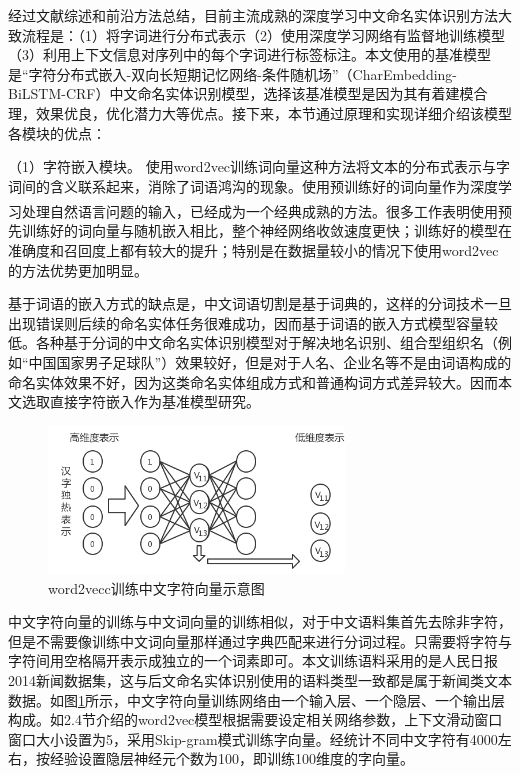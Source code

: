 \documentclass[winfonts,master,oneside,nobackinfo]{njuthesis}
\newcommand{\upcite}[1]{\textsuperscript{\textsuperscript{\cite{#1}}}}
\begin{document}
经过文献综述和前沿方法总结，目前主流成熟的深度学习中文命名实体识别方法大致流程是：（1）将字词进行分布式表示（2）使用深度学习网络有监督地训练模型（3）利用上下文信息对序列中的每个字词进行标签标注。本文使用的基准模型是“字符分布式嵌入-双向长短期记忆网络-条件随机场”（CharEmbedding-BiLSTM-CRF）中文命名实体识别模型，选择该基准模型是因为其有着建模合理，效果优良，优化潜力大等优点。接下来，本节通过原理和实现详细介绍该模型各模块的优点：

（1）字符嵌入模块。
使用word2vec训练词向量这种方法将文本的分布式表示与字词间的含义联系起来，消除了词语鸿沟的现象。使用预训练好的词向量作为深度学习处理自然语言问题的输入，已经成为一个经典成熟的方法。很多工作表明\upcite{Yoon}使用预先训练好的词向量与随机嵌入相比，整个神经网络收敛速度更快；训练好的模型在准确度和召回度上都有较大的提升；特别是在数据量较小的情况下使用word2vec的方法优势更加明显。

基于词语的嵌入方式的缺点是，中文词语切割是基于词典的，这样的分词技术一旦出现错误则后续的命名实体任务很难成功，因而基于词语的嵌入方式模型容量较低。各种基于分词的中文命名实体识别模型对于解决地名识别、组合型组织名（例如“中国国家男子足球队”）效果较好，但是对于人名、企业名等不是由词语构成的命名实体效果不好，因为这类命名实体组成方式和普通构词方式差异较大。因而本文选取直接字符嵌入作为基准模型研究。

\begin{figure}[h]
\centering
\includegraphics[width=0.7\textwidth]{./figure/char2vec.jpg}
\caption{word2vecc训练中文字符向量示意图}
\label{char2vec}
\end{figure}

中文字符向量的训练与中文词向量的训练相似，对于中文语料集首先去除非字符，但是不需要像训练中文词向量那样通过字典匹配来进行分词过程。只需要将字符与字符间用空格隔开表示成独立的一个词素即可。本文训练语料采用的是人民日报2014新闻数据集，这与后文命名实体识别使用的语料类型一致都是属于新闻类文本数据。如图\ref{char2vec}所示，中文字符向量训练网络由一个输入层、一个隐层、一个输出层构成。如2.4节介绍的word2vec模型根据需要设定相关网络参数，上下文滑动窗口窗口大小设置为5，采用Skip-gram模式训练字向量。经统计不同中文字符有4000左右，按经验设置隐层神经元个数为100，即训练100维度的字向量。
\end{document}
